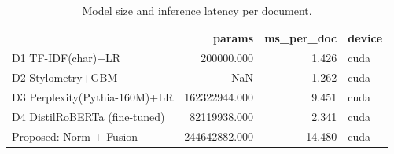 \begin{table}
\caption{Model size and inference latency per document.}
\label{tab:table4_efficiency}
\begin{tabular}{lrrl}
\toprule
 & params & ms_per_doc & device \\
\midrule
D1 TF-IDF(char)+LR & 200000.000 & 1.426 & cuda \\
D2 Stylometry+GBM & NaN & 1.262 & cuda \\
D3 Perplexity(Pythia-160M)+LR & 162322944.000 & 9.451 & cuda \\
D4 DistilRoBERTa (fine-tuned) & 82119938.000 & 2.341 & cuda \\
Proposed: Norm + Fusion & 244642882.000 & 14.480 & cuda \\
\bottomrule
\end{tabular}
\end{table}
